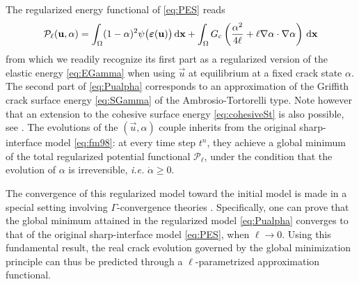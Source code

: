 The regularized energy functional of \eqref{eq:PES} reads
\begin{equation} \label{eq:Pualpha}
\mathcal{P}_\ell(\vec{u},\alpha)=\int_\Omega(1-\alpha)^2\psi\bigl(\eps(\vec{u})\bigr)\dx+\int_\Omega\gc\left(\frac{\alpha^2}{4\ell}+\ell\nabla\alpha\cdot\nabla\alpha\right)\dx
\end{equation}
from which we readily recognize its first part as a regularized version of the elastic energy \eqref{eq:EGamma} when using $\vec{u}$ at equilibrium at a fixed crack state $\alpha$. The second part of \eqref{eq:Pualpha} corresponds to an approximation of the Griffith crack surface energy \eqref{eq:SGamma} of the Ambrosio-Tortorelli type. Note however that an extension to the cohesive surface energy \eqref{eq:cohesiveSt} is also possible, see \cite{ContiFocardiIurlano:2015}. The evolutions of the $(\vec{u},\alpha)$ couple inherits from the original sharp-interface model \eqref{eq:fm98}: at every time step $t^n$, they achieve a global minimum of the total regularized potential functional $\mathcal{P}_\ell$, under the condition that the evolution of $\alpha$ is irreversible, \emph{i.e.} $\dot{\alpha}\geq 0$.

The convergence of this regularized model toward the initial model is made in a special setting involving $\Gamma$-convergence theories \cite{Braides:2002}. Specifically, one can prove that the global minimum attained in the regularized model \eqref{eq:Pualpha} converges to that of the original sharp-interface model \eqref{eq:PES}, when $\ell\to 0$. Using this fundamental result, the real crack evolution governed by the global minimization principle can thus be predicted through a $\ell$-parametrized approximation functional. 

